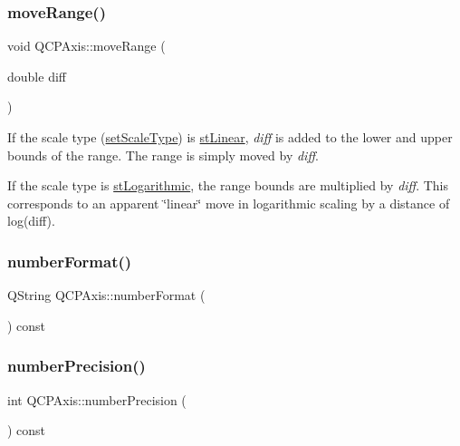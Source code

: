 \subsubsection{\texorpdfstring{move\+Range()}{moveRange()}}
{\footnotesize\ttfamily void Q\+C\+P\+Axis\+::move\+Range (\begin{DoxyParamCaption}\item[{double}]{diff }\end{DoxyParamCaption})}

If the scale type (\hyperlink{class_q_c_p_axis_adef29cae617af4f519f6c40d1a866ca6}{set\+Scale\+Type}) is \hyperlink{class_q_c_p_axis_a36d8e8658dbaa179bf2aeb973db2d6f0aff6e30a11a828bc850caffab0ff994f6}{st\+Linear}, {\itshape diff} is added to the lower and upper bounds of the range. The range is simply moved by {\itshape diff}.

If the scale type is \hyperlink{class_q_c_p_axis_a36d8e8658dbaa179bf2aeb973db2d6f0abf5b785ad976618816dc6f79b73216d4}{st\+Logarithmic}, the range bounds are multiplied by {\itshape diff}. This corresponds to an apparent \char`\"{}linear\char`\"{} move in logarithmic scaling by a distance of log(diff). \mbox{\label{class_q_c_p_axis_a20cc29c2f282a0e9efd8f32145e47be6}} 
\subsubsection{\texorpdfstring{number\+Format()}{numberFormat()}}
{\footnotesize\ttfamily Q\+String Q\+C\+P\+Axis\+::number\+Format (\begin{DoxyParamCaption}{ }\end{DoxyParamCaption}) const}

\mbox{\label{class_q_c_p_axis_a2562b6f3a4a01c7ed83a388042664998}} 
\subsubsection{\texorpdfstring{number\+Precision()}{numberPrecision()}}
{\footnotesize\ttfamily int Q\+C\+P\+Axis\+::number\+Precision (\begin{DoxyParamCaption}{ }\end{DoxyParamCaption}) const\hspace{0.3cm}{\ttfamily [inline]}}

